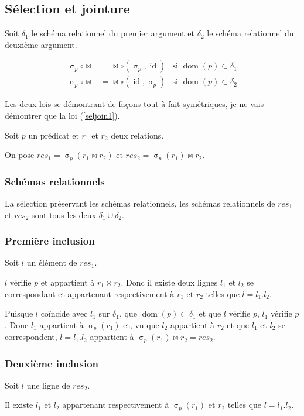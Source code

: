 \documentclass[french]{article}
\DeclareMathOperator{\sel}{\sigma}
\DeclareMathOperator{\id}{id}
\DeclareMathOperator{\dom}{dom}
\newcommand{\selP}{\sel_p}
\begin{document}
\subsection*{Sélection et jointure}
Soit $\delta_1$ le schéma relationnel du premier
argument et $\delta_2$ le schéma relationnel du deuxième
argument.

\begin{align}
\selP \circ \Join
& = \Join \circ (\selP, \id)
& \text{si $\dom(p) \subset \delta_1$}
\label{seljoin1}\\ 
\selP \circ \Join
& = \Join \circ (\id, \selP)
& \text{si $\dom(p) \subset \delta_2$}
\end{align}

Les deux lois se démontrant de façons tout à fait 
symétriques, je ne vais démontrer que la loi (\ref{seljoin1}).

Soit $p$ un prédicat et $r_1$ et $r_2$ deux relations.

On pose $res_1 = \selP(r_1 \Join r_2)$ et
$res_2 = \selP(r_1) \Join r_2$.

\subsubsection*{Schémas relationnels}
La sélection préservant les schémas relationnels,
les schémas relationnels de $res_1$ et $res_2$
sont tous les deux $\delta_1 \cup \delta_2$.

\subsubsection*{Première inclusion}
Soit $l$ un élément de $res_1$.

$l$ vérifie $p$ et appartient à $r_1 \Join r_2$.
Donc il existe deux lignes $l_1$ et $l_2$
se correspondant et appartenant respectivement
à $r_1$ et $r_2$ telles que $l= l_1 . l_2$.

Puisque $l$ coïncide avec $l_1$ sur $\delta_1$,
que $\dom(p) \subset \delta_1$ et que $l$ vérifie $p$,
$l_1$ vérifie $p$. Donc $l_1$ appartient à $\selP(r_1)$
et, vu que $l_2$ appartient à $r_2$ et que $l_1$ et $l_2$
se correspondent, $l = l_1. l_2$ appartient à $\selP(r_1) \Join r_2 = res_2$.

\subsubsection*{Deuxième inclusion}
Soit $l$ une ligne de $res_2$.

Il existe $l_1$ et $l_2$ appartenant respectivement à
$\selP(r_1)$ et $r_2$ telles que
$l = l_1 . l_2 $.
\end{document}
